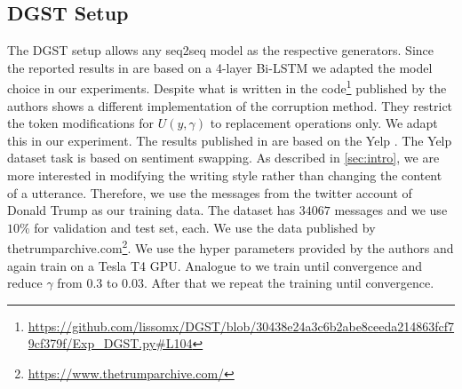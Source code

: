 \documentclass[twocolumn]{tum-article}
\begin{document}
\subsection{DGST Setup}\label{sec:dgst_setup}
The DGST setup allows any seq2seq model as the respective generators. Since the reported results in \cite{li2020dgst} are based on a 4-layer Bi-LSTM we adapted the model choice in our experiments. Despite what is written in \cite{li2020dgst} the code\footnote{\url{https://github.com/lissomx/DGST/blob/30438e24a3c6b2abe8ceeda214863fcf79cf379f/Exp\_DGST.py\#L104}} published by the authors shows a different implementation of the corruption method. They restrict the token modifications for $U(y, \gamma)$ to replacement operations only. We adapt this in our experiment. The results published in \cite{li2020dgst} are based on the Yelp \cite{li2018delete}. The Yelp dataset task is based on sentiment swapping. As described in \autoref{sec:intro}, we are more interested in modifying the writing style rather than changing the content of a utterance. Therefore, we use the messages from the twitter account of Donald Trump as our training data. The dataset has $34067$ messages and we use $10\%$ for validation and test set, each. We use the data published by thetrumparchive.com\footnote{\url{https://www.thetrumparchive.com/}}. We use the hyper parameters provided by the authors and again train on a Tesla T4 GPU. Analogue to \cite{li2020dgst} we train until convergence and reduce $\gamma$ from $0.3$ to $0.03$. After that we repeat the training until convergence.     
\end{document}
